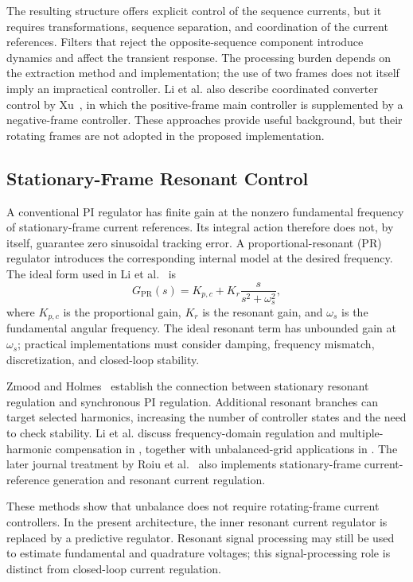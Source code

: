 The resulting structure offers explicit control of the sequence currents, but it requires transformations, sequence separation, and coordination of the current references. Filters that reject the opposite-sequence component introduce dynamics and affect the transient response. The processing burden depends on the extraction method and implementation; the use of two frames does not itself imply an impractical controller. Li et al. also describe coordinated converter control by Xu~\cite{ch5-xu2008}, in which the positive-frame main controller is supplemented by a negative-frame controller. These approaches provide useful background, but their rotating frames are not adopted in the proposed implementation.

\subsection{Stationary-Frame Resonant Control}
A conventional PI regulator has finite gain at the nonzero fundamental frequency of stationary-frame current references. Its integral action therefore does not, by itself, guarantee zero sinusoidal tracking error. A proportional-resonant (PR) regulator introduces the corresponding internal model at the desired frequency. The ideal form used in Li et al.~\cite{li2010journal} is
\begin{equation}
G_{\mathrm{PR}}(s)=K_{p,c}+K_r\frac{s}{s^2+\omega_s^2},
\label{eq:ch5-pr}
\end{equation}
where $K_{p,c}$ is the proportional gain, $K_r$ is the resonant gain, and $\omega_s$ is the fundamental angular frequency. The ideal resonant term has unbounded gain at $\omega_s$; practical implementations must consider damping, frequency mismatch, discretization, and closed-loop stability.

Zmood and Holmes~\cite{ch5-zmood2003} establish the connection between stationary resonant regulation and synchronous PI regulation. Additional resonant branches can target selected harmonics, increasing the number of controller states and the need to check stability. Li et al. discuss frequency-domain regulation and multiple-harmonic compensation in \cite{ch5-zmood2001,ch5-bojoi2005,ch5-liserre2006,ch5-hwang2006}, together with unbalanced-grid applications in \cite{ch5-hwang2007,ch5-roiu2008,ch5-etxeberria2007,ch5-hu2009}. The later journal treatment by Roiu et al.~\cite{ch5-roiu2010} also implements stationary-frame current-reference generation and resonant current regulation.

These methods show that unbalance does not require rotating-frame current controllers. In the present architecture, the inner resonant current regulator is replaced by a predictive regulator. Resonant signal processing may still be used to estimate fundamental and quadrature voltages; this signal-processing role is distinct from closed-loop current regulation.


